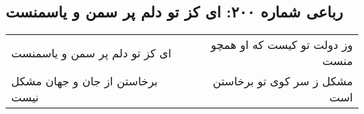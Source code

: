 \begin{center}
\section*{رباعی شماره ۲۰۰: ای کز تو دلم پر سمن و یاسمنست}
\label{sec:0200}
\begin{longtable}{l p{0.5cm} r}
ای کز تو دلم پر سمن و یاسمنست
&&
وز دولت تو کیست که او همچو منست
\\
برخاستن از جان و جهان مشکل نیست
&&
مشکل ز سر کوی تو برخاستن است
\\
\end{longtable}
\end{center}
